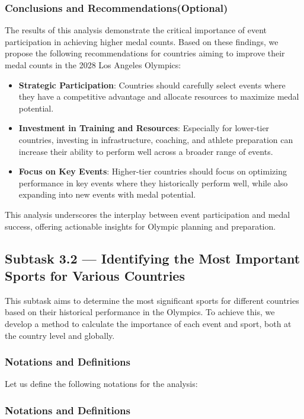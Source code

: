 \documentclass{mcmthesis}
\begin{document}
\subsubsection{Conclusions and Recommendations(Optional)}
The results of this analysis demonstrate the critical importance of event participation in achieving higher medal counts. Based on these findings, we propose the following recommendations for countries aiming to improve their medal counts in the 2028 Los Angeles Olympics:
\begin{itemize}
    \item \textbf{Strategic Participation}: Countries should carefully select events where they have a competitive advantage and allocate resources to maximize medal potential.
    \item \textbf{Investment in Training and Resources}: Especially for lower-tier countries, investing in infrastructure, coaching, and athlete preparation can increase their ability to perform well across a broader range of events.
    \item \textbf{Focus on Key Events}: Higher-tier countries should focus on optimizing performance in key events where they historically perform well, while also expanding into new events with medal potential.
\end{itemize}
This analysis underscores the interplay between event participation and medal success, offering actionable insights for Olympic planning and preparation.

\subsection{Subtask 3.2 --- Identifying the Most Important Sports for Various Countries}

This subtask aims to determine the most significant sports for different countries based on their historical performance in the Olympics. To achieve this, we develop a method to calculate the importance of each event and sport, both at the country level and globally. 

\subsubsection{Notations and Definitions}
Let us define the following notations for the analysis:
\subsubsection{Notations and Definitions}
\end{document}
